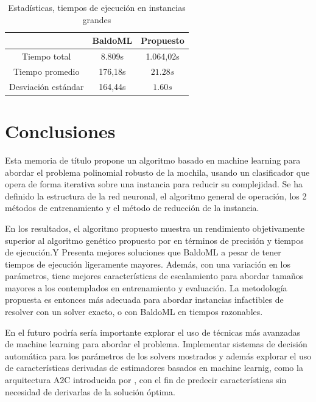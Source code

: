 \documentclass[spanish, a4paper, 12pt, openany,final]{book}
\begin{document}
\begin{table}[H]
	\centering
	\caption{Estadísticas, tiempos de ejecución en instancias grandes}
	\begin{tabular}{|c|c|c|}
		\hline
		&BaldoML& Propuesto\\
		\hline
		Tiempo total & 8.809s & 1.064,02s\\
		\hline
		Tiempo promedio &176,18s & $21.28s$ \\
		\hline
		Desviación estándar &164,44s& $1.60s$\\
		\hline
	\end{tabular}
\end{table}


\chapter{Conclusiones}
Esta memoria de título propone un algoritmo basado en machine learning para abordar el problema polinomial robusto de la mochila, usando un clasificador que opera de forma iterativa sobre una instancia para reducir su complejidad. Se ha definido la estructura de la red neuronal, el algoritmo general de operación, los 2 métodos de entrenamiento y el método de reducción de la instancia.
 
En los resultados, el algoritmo propuesto muestra un rendimiento objetivamente superior al algoritmo genético propuesto por \cite{baldo_polynomial_2023} en términos de precisión y tiempos de ejecución.Y Presenta mejores soluciones que BaldoML a pesar de tener tiempos de ejecución ligeramente mayores. Además, con una variación en los parámetros, tiene mejores características de escalamiento para abordar tamaños mayores a los contemplados en entrenamiento y evaluación. La metodología propuesta es entonces más adecuada para abordar instancias infactibles de resolver con un solver exacto, o con BaldoML en tiempos razonables.

En el futuro podría sería importante explorar el uso de técnicas más avanzadas de machine learning para abordar el problema. Implementar sistemas de decisión automática para los parámetros de los solvers mostrados y además explorar el uso de características derivadas de estimadores basados en machine learnig, como la arquitectura A2C introducida por \cite{mnih_asynchronous_2016}, con el fin de predecir características sin necesidad de derivarlas de la solución óptima.




    
    
\clearpage

\newpage
\renewcommand\refname{Referencias}          %
{                           %
}

\newpage
\renewcommand{\appendixpagename}{Apéndices}     %
\end{document}
